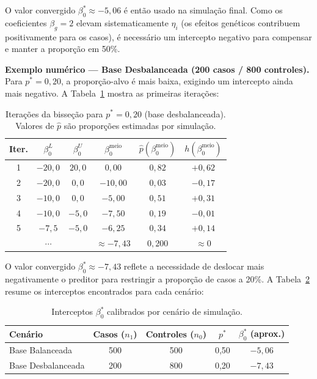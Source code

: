 \documentclass[
    12pt,
    a4paper,
    oneside,
    english,
    french,
    spanish,
    brazil
    ]{abntex2}
\renewcommand{\arraystretch}{1.3}
\newcommand{\novo}[1]{\textcolor{corNova}{#1}}
\begin{document}
\novo{O valor convergido $\beta_0^* \approx -5{,}06$ é então usado na simulação final. Como os coeficientes $\beta_g = 2$ elevam sistematicamente $\eta_i$ (os efeitos genéticos contribuem positivamente para os casos), é necessário um intercepto negativo para compensar e manter a proporção em 50\%.}

\novo{\textbf{Exemplo numérico --- Base Desbalanceada (200 casos / 800 controles).} Para $p^* = 0{,}20$, a proporção-alvo é mais baixa, exigindo um intercepto ainda mais negativo. A Tabela~\ref{tab:bissecao_desbal} mostra as primeiras iterações:}

\begin{table}[H]
\centering
\caption{\novo{Iterações da bisseção para $p^* = 0{,}20$ (base desbalanceada). Valores de $\widehat{p}$ são proporções estimadas por simulação.}}
\label{tab:bissecao_desbal}
\small
\renewcommand{\arraystretch}{1.3}
\begin{tabular}{cccccc}
\hline
\textbf{Iter.} & $\beta_0^L$ & $\beta_0^U$ & $\beta_0^{\text{meio}}$ & $\widehat{p}(\beta_0^{\text{meio}})$ & $h(\beta_0^{\text{meio}})$ \\
\hline
1 & $-20{,}0$ & $20{,}0$ & $ 0{,}00$ & $0{,}82$ & $+0{,}62$ \\
2 & $-20{,}0$ & $ 0{,}0$ & $-10{,}00$ & $0{,}03$ & $-0{,}17$ \\
3 & $-10{,}0$ & $ 0{,}0$ & $ -5{,}00$ & $0{,}51$ & $+0{,}31$ \\
4 & $-10{,}0$ & $-5{,}0$ & $ -7{,}50$ & $0{,}19$ & $-0{,}01$ \\
5 & $ -7{,}5$ & $-5{,}0$ & $ -6{,}25$ & $0{,}34$ & $+0{,}14$ \\
\multicolumn{3}{c}{$\cdots$} & $\approx -7{,}43$ & $0{,}200$ & $\approx 0$ \\
\hline
\end{tabular}
\end{table}

\novo{O valor convergido $\beta_0^* \approx -7{,}43$ reflete a necessidade de deslocar mais negativamente o preditor para restringir a proporção de casos a 20\%. A Tabela~\ref{tab:beta0_resumo} resume os interceptos encontrados para cada cenário:}

\begin{table}[H]
\centering
\caption{\novo{Interceptos $\beta_0^*$ calibrados por cenário de simulação.}}
\label{tab:beta0_resumo}
\small
\renewcommand{\arraystretch}{1.3}
\begin{tabular}{lcccc}
\hline
\textbf{Cenário} & \textbf{Casos ($n_1$)} & \textbf{Controles ($n_0$)} & $p^*$ & $\beta_0^*$ (aprox.) \\
\hline
Base Balanceada    & 500 & 500 & 0{,}50 & $-5{,}06$ \\
Base Desbalanceada & 200 & 800 & 0{,}20 & $-7{,}43$ \\
\hline
\end{tabular}
\end{table}
\end{document}

